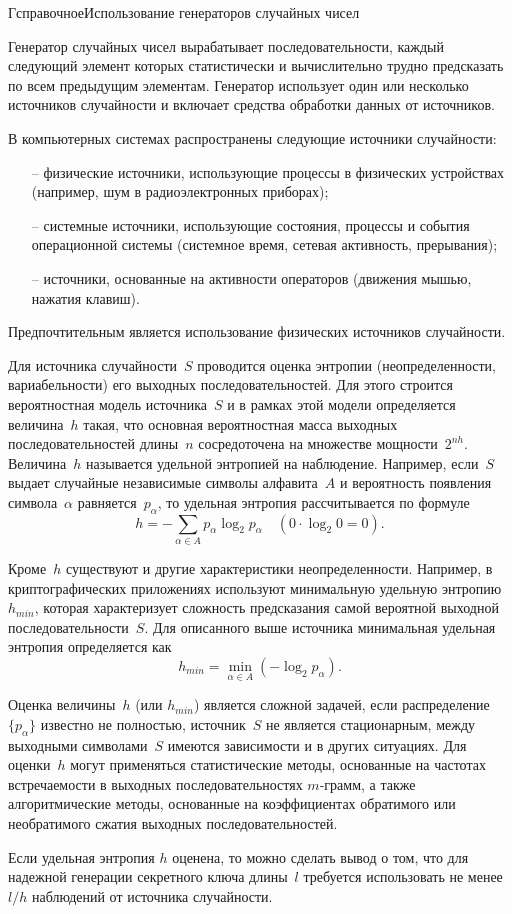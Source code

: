 \begin{appendix}{Г}{справочное}{Использование генераторов случайных чисел}
\label{RNG}

\mbox{}

Генератор случайных чисел вырабатывает последовательности,
каждый следующий элемент которых статистически и вычислительно 
трудно предсказать по всем предыдущим элементам.
%
Генератор использует один или несколько 
источников случайности и включает средства 
обработки данных от источников. 

В компьютерных системах распространены следующие источники случайности:
\begin{itemize}
\item[--]
физические источники, использующие процессы в физических устройствах
(например, шум в радиоэлектронных приборах);

\item[--]
системные источники, использующие состояния, 
процессы и события операционной системы
(системное время, сетевая активность, прерывания);

\item[--]
источники, основанные на активности операторов
(движения мышью, нажатия клавиш).
\end{itemize}

Предпочтительным является использование физических источников случайности.

Для источника случайности~$S$ проводится оценка энтропии 
(неопределенности, вариабельности) его выходных последовательностей.
Для этого строится вероятностная модель источника~$S$ 
и в рамках этой модели определяется величина~$h$ такая, 
что основная вероятностная масса выходных последовательностей 
длины~$n$ сосредоточена на множестве мощности~$2^{nh}$.
Величина~$h$ называется удельной энтропией на наблюдение.
%
Например, если~$S$ выдает случайные независимые символы 
алфавита~$A$ и вероятность появления символа~$\alpha$ 
равняется~$p_\alpha$, то удельная энтропия рассчитывается по формуле
$$
h=-\sum_{\alpha\in A}p_\alpha\log_2 p_\alpha\quad
(0\cdot\log_2 0=0).
$$

Кроме~$h$ существуют и другие характеристики неопределенности.
Например, в криптографических приложениях используют 
минимальную удельную энтропию~$h_{min}$, которая характеризует 
сложность предсказания самой вероятной выходной последовательности~$S$.
Для описанного выше источника минимальная удельная энтропия
определяется как
$$
h_{min}=\min_{\alpha\in A}(-\log_2 p_\alpha).
$$

Оценка величины~$h$ (или $h_{min}$) является сложной задачей, 
если распределение $\{p_\alpha\}$ известно не полностью,
источник~$S$ не является стационарным,
между выходными символами~$S$ имеются зависимости и в других ситуациях.
%
Для оценки~$h$ могут применяться статистические методы,
основанные на частотах встречаемости в выходных последовательностях
$m$-грамм, а также алгоритмические методы, основанные на коэффициентах 
обратимого или необратимого сжатия выходных 
последовательностей.

Если удельная энтропия $h$ оценена, то можно сделать вывод о том, что для 
надежной генерации секретного ключа длины~$l$ требуется использовать 
не менее $l/h$ наблюдений от источника случайности.

\end{appendix}
